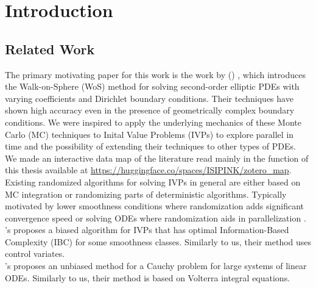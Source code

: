 \documentclass[a4paper,12pt]{article}
\begin{document}


\newpage
\tableofcontents
\newpage

\begin{abstract}
  
\end{abstract}


\section{Introduction}

\subsection{Related Work}
The primary motivating paper for this work is the work
by \citeauthor{sawhney_grid-free_2022}
(\citeyear{sawhney_grid-free_2022}) \cite{sawhney_grid-free_2022},
which introduces the Walk-on-Sphere (WoS) method for solving second-order
elliptic PDEs with varying coefficients and Dirichlet boundary conditions.
Their techniques have shown high accuracy even in the presence of geometrically
complex boundary conditions. We were inspired to apply the underlying
mechanics of these Monte Carlo (MC) techniques to Inital Value Problems (IVPs) to explore
parallel in time and the possibility of extending their techniques
to other types of PDEs. \\

We made an interactive data map of the literature read
mainly in the function of this thesis available at
\url{https://huggingface.co/spaces/ISIPINK/zotero_map}.\\

Existing randomized algorithms for solving IVPs in general are either based
on MC integration or randomizing parts of deterministic
algorithms. Typically motivated by lower smoothness conditions where
randomization adds significant
convergence speed or solving ODEs where randomization
aids in parallelization .\\

\citeauthor{daun_randomized_2011}'s \citeyear{daun_randomized_2011}
\cite{daun_randomized_2011} proposes a biased algorithm for IVPs that has optimal Information-Based
Complexity (IBC) for some smoothness classes. Similarly to us, their method uses control variates.\\


\citeauthor{ermakov_monte_2021}'s \citeyear{ermakov_monte_2021}
\cite{ermakov_monte_2021} proposes an unbiased method for
a Cauchy problem for large systems of linear ODEs.
Similarly to us, their method is based on Volterra integral equations.\\
\end{document}
